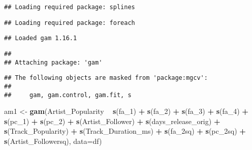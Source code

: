 \documentclass[
]{article}
\newenvironment{Shaded}{\begin{snugshade}}{\end{snugshade}}
\newcommand{\CommentTok}[1]{\textcolor[rgb]{0.56,0.35,0.01}{\textit{#1}}}
\newcommand{\DataTypeTok}[1]{\textcolor[rgb]{0.13,0.29,0.53}{#1}}
\newcommand{\DecValTok}[1]{\textcolor[rgb]{0.00,0.00,0.81}{#1}}
\newcommand{\KeywordTok}[1]{\textcolor[rgb]{0.13,0.29,0.53}{\textbf{#1}}}
\newcommand{\NormalTok}[1]{#1}
\newcommand{\OperatorTok}[1]{\textcolor[rgb]{0.81,0.36,0.00}{\textbf{#1}}}
\newcommand{\StringTok}[1]{\textcolor[rgb]{0.31,0.60,0.02}{#1}}
\begin{document}
\begin{Shaded}
\end{Shaded}

\begin{verbatim}
## Loading required package: splines
\end{verbatim}

\begin{verbatim}
## Loading required package: foreach
\end{verbatim}

\begin{verbatim}
## Loaded gam 1.16.1
\end{verbatim}

\begin{verbatim}
## 
## Attaching package: 'gam'
\end{verbatim}

\begin{verbatim}
## The following objects are masked from 'package:mgcv':
## 
##     gam, gam.control, gam.fit, s
\end{verbatim}

\begin{Shaded}
\begin{Highlighting}[]
\NormalTok{am1 <-}\StringTok{ }\KeywordTok{gam}\NormalTok{(Artist_Popularity }\OperatorTok{~}\StringTok{ }\KeywordTok{s}\NormalTok{(fa_}\DecValTok{1}\NormalTok{) }\OperatorTok{+}\StringTok{ }\KeywordTok{s}\NormalTok{(fa_}\DecValTok{2}\NormalTok{) }\OperatorTok{+}\StringTok{ }\KeywordTok{s}\NormalTok{(fa_}\DecValTok{3}\NormalTok{) }\OperatorTok{+}\StringTok{ }\KeywordTok{s}\NormalTok{(fa_}\DecValTok{4}\NormalTok{) }\OperatorTok{+}\StringTok{ }\KeywordTok{s}\NormalTok{(pc_}\DecValTok{1}\NormalTok{) }\OperatorTok{+}\StringTok{ }\KeywordTok{s}\NormalTok{(pc_}\DecValTok{2}\NormalTok{) }\OperatorTok{+}\StringTok{ }\KeywordTok{s}\NormalTok{(Artist_Follower) }\OperatorTok{+}\StringTok{ }\KeywordTok{s}\NormalTok{(days_release_orig) }\OperatorTok{+}\StringTok{ }\KeywordTok{s}\NormalTok{(Track_Popularity) }\OperatorTok{+}\StringTok{ }\KeywordTok{s}\NormalTok{(Track_Duration_ms) }\OperatorTok{+}\StringTok{ }\KeywordTok{s}\NormalTok{(fa_2sq) }\OperatorTok{+}\StringTok{ }\KeywordTok{s}\NormalTok{(pc_2sq) }\OperatorTok{+}\StringTok{ }\KeywordTok{s}\NormalTok{(Artist_Followersq), }\DataTypeTok{data=}\NormalTok{df)}
\end{Highlighting}
\end{Shaded}
\end{document}
